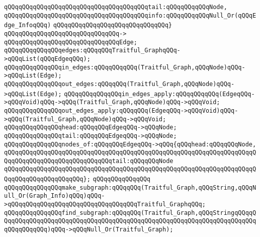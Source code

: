 \verb|qQQqqQQqqQQqqQQqqQQqqQQqqQQqqQQqqQQqqQQqtail:qQQqqQQqqQQqNode,|\newline
\verb|qQQqqQQqqQQqqQQqqQQqqQQqqQQqqQQqqQQqqQQqinfo:qQQqqQQqqQQqNull_Or(qQQqEdge_InfoqQQq)|\newline
\verb|qQQqqQQqqQQqqQQqqQQqqQQqqQQqqQQq}|\newline
\verb|qQQqqQQqqQQqqQQqqQQqqQQqqQQqqQQq->|\newline
\verb|qQQqqQQqqQQqqQQqqQQqqQQqqQQqqQQqEdge;|\newline
\newline
\verb|qQQqqQQqqQQqqQQqedges:qQQqqQQqTraitful_GraphqQQq->qQQqList(qQQqEdgeqQQq);|\newline
\newline
\verb|qQQqqQQqqQQqqQQqin_edges:qQQqqQQqqQQq(Traitful_Graph,qQQqNode)qQQq->qQQqList(Edge);|\newline
\verb|qQQqqQQqqQQqqQQqout_edges:qQQqqQQq(Traitful_Graph,qQQqNode)qQQq->qQQqList(Edge);|\newline
\newline
\verb|qQQqqQQqqQQqqQQqin_edges_apply:qQQqqQQqqQQq(EdgeqQQq->qQQqVoid)qQQq->qQQq(Traitful_Graph,qQQqNode)qQQq->qQQqVoid;|\newline
\verb|qQQqqQQqqQQqqQQqout_edges_apply:qQQqqQQq(EdgeqQQq->qQQqVoid)qQQq->qQQq(Traitful_Graph,qQQqNode)qQQq->qQQqVoid;|\newline
\newline
\verb|qQQqqQQqqQQqqQQqhead:qQQqqQQqEdgeqQQq->qQQqNode;|\newline
\verb|qQQqqQQqqQQqqQQqtail:qQQqqQQqEdgeqQQq->qQQqNode;|\newline
\newline
\verb|qQQqqQQqqQQqqQQqnodes_of:qQQqqQQqEdgeqQQq->qQQq{qQQqhead:qQQqqQQqNode,|\newline
\verb|qQQqqQQqqQQqqQQqqQQqqQQqqQQqqQQqqQQqqQQqqQQqqQQqqQQqqQQqqQQqqQQqqQQqqQQqqQQqqQQqqQQqqQQqqQQqqQQqqQQqtail:qQQqqQQqNode|\newline
\verb|qQQqqQQqqQQqqQQqqQQqqQQqqQQqqQQqqQQqqQQqqQQqqQQqqQQqqQQqqQQqqQQqqQQqqQQqqQQqqQQqqQQqqQQqqQQq};|\newline
\verb|qQQqqQQqqQQqqQQq|\newline
\verb|qQQqqQQqqQQqqQQqmake_subgraph:qQQqqQQq(Traitful_Graph,qQQqString,qQQqNull_Or(Graph_Info)qQQq)qQQq->qQQqqQQqqQQqqQQqqQQqqQQqqQQqqQQqqQQqTraitful_GraphqQQq;|\newline
\verb|qQQqqQQqqQQqqQQqfind_subgraph:qQQqqQQq(Traitful_Graph,qQQqStringqQQqqQQqqQQqqQQqqQQqqQQqqQQqqQQqqQQqqQQqqQQqqQQqqQQqqQQqqQQqqQQqqQQqqQQqqQQqqQQqqQQqqQQq)qQQq->qQQqNull_Or(Traitful_Graph);|\newline

